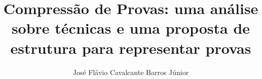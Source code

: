 \documentclass[master, brazilian]{ThesisPUC}
\author{José Flávio Cavalcante Barros Júnior}
\title{Compressão de Provas: uma análise sobre técnicas e uma proposta de estrutura para representar provas}
\begin{document}
  
  
  
  
  
  
  
  
  \arial
  
\end{document}
